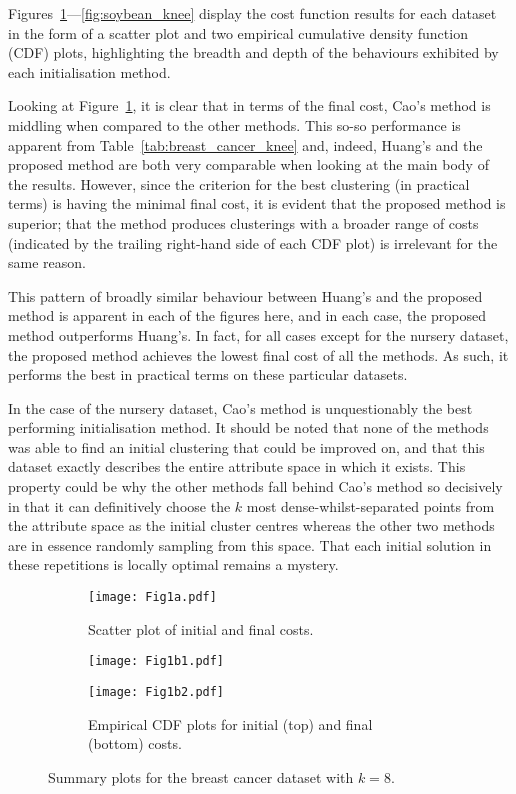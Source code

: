 Figures~\ref{fig:breast_cancer_knee}---\ref{fig:soybean_knee} display the cost
function results for each dataset in the form of a scatter plot and two
empirical cumulative density function (CDF) plots, highlighting the breadth and
depth of the behaviours exhibited by each initialisation method.

Looking at Figure~\ref{fig:breast_cancer_knee}, it is clear that in terms of the
final cost, Cao's method is middling when compared to the other methods. This
so-so performance is apparent from Table~\ref{tab:breast_cancer_knee} and,
indeed, Huang's and the proposed method are both very comparable when looking at
the main body of the results. However, since the criterion for the best
clustering (in practical terms) is having the minimal final cost, it is evident
that the proposed method is superior; that the method produces clusterings with
a broader range of costs (indicated by the trailing right-hand side of each CDF
plot) is irrelevant for the same reason.

This pattern of broadly similar behaviour between Huang's and the proposed
method is apparent in each of the figures here, and in each case, the proposed
method outperforms Huang's. In fact, for all cases except for the nursery
dataset, the proposed method achieves the lowest final cost of all the methods.
As such, it performs the best in practical terms on these particular datasets.

In the case of the nursery dataset, Cao's method is unquestionably the best
performing initialisation method. It should be noted that none of the methods
was able to find an initial clustering that could be improved on, and that this
dataset exactly describes the entire attribute space in which it exists. This
property could be why the other methods fall behind Cao's method so decisively
in that it can definitively choose the \(k\) most dense-whilst-separated points
from the attribute space as the initial cluster centres whereas the other two
methods are in essence randomly sampling from this space. That each initial
solution in these repetitions is locally optimal remains a mystery.

\begin{figure}
    \begin{subfigure}{.5\textwidth}
        \texttt{[image: Fig1a.pdf]}
        \caption{Scatter plot of initial and final costs.}
    \end{subfigure}
    \hfill%
    \begin{subfigure}{.5\textwidth}
        \texttt{[image: Fig1b1.pdf]}

        \texttt{[image: Fig1b2.pdf]}
        \caption{Empirical CDF plots for initial (top) and final (bottom)
                 costs.}
    \end{subfigure}
    \caption{Summary plots for the breast cancer dataset with \(k=8\).}%
    \label{fig:breast_cancer_knee}
\end{figure}

